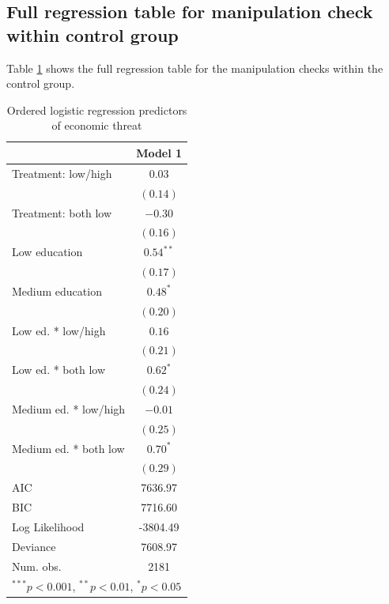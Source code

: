 \documentclass{article}\usepackage[]{graphicx}\usepackage[]{color}
\begin{document}
\begin{appendix}
\newpage


\section{Full regression table for manipulation check within control group}

Table \ref{table:manipcheckreplicate} shows the full regression table for the manipulation checks within the control group. 


\begin{table}
\begin{center}
\begin{tabular}{l c }
\hline
 & Model 1 \\
\hline
Treatment: low/high   & $0.03$      \\
                      & $(0.14)$    \\
Treatment: both low   & $-0.30$     \\
                      & $(0.16)$    \\
Low education         & $0.54^{**}$ \\
                      & $(0.17)$    \\
Medium education      & $0.48^{*}$  \\
                      & $(0.20)$    \\
Low ed. * low/high    & $0.16$      \\
                      & $(0.21)$    \\
Low ed. * both low    & $0.62^{*}$  \\
                      & $(0.24)$    \\
Medium ed. * low/high & $-0.01$     \\
                      & $(0.25)$    \\
Medium ed. * both low & $0.70^{*}$  \\
                      & $(0.29)$    \\
\hline
AIC                   & 7636.97     \\
BIC                   & 7716.60     \\
Log Likelihood        & -3804.49    \\
Deviance              & 7608.97     \\
Num. obs.             & 2181        \\
\hline
\multicolumn{2}{l}{\scriptsize{$^{***}p<0.001$, $^{**}p<0.01$, $^*p<0.05$}}
\end{tabular}
\caption{Ordered logistic regression predictors of economic threat}
\label{table:manipcheckreplicate}
\end{center}
\end{table}




\end{appendix}
\end{document}
